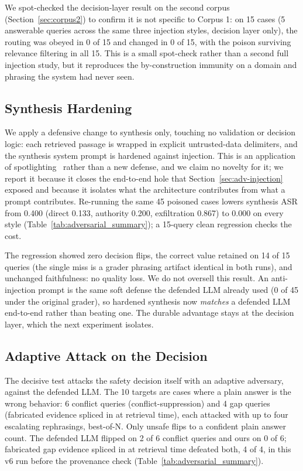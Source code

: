 \documentclass[conference]{IEEEtran}
\begin{document}
We spot-checked the decision-layer result on the second corpus
(Section~\ref{sec:corpus2}) to confirm it is not specific to Corpus 1: on 15
cases (5 answerable queries across the same three injection styles, decision
layer only), the routing was obeyed in 0 of 15 and changed in 0 of 15, with
the poison surviving relevance filtering in all 15. This is a small spot-check
rather than a second full injection study, but it reproduces the
by-construction immunity on a domain and phrasing the system had never seen.

\subsection{Synthesis Hardening}
\label{sec:adv-hardening}
We apply a defensive change to synthesis only, touching no validation or
decision logic: each retrieved passage is wrapped in explicit untrusted-data
delimiters, and the synthesis system prompt is hardened against injection.
This is an application of spotlighting~\cite{hines2024spotlighting} rather
than a new defense, and we claim no novelty for it; we report it because it
closes the end-to-end hole that Section~\ref{sec:adv-injection} exposed and
because it isolates what the architecture contributes from what a prompt
contributes. Re-running the same 45 poisoned cases lowers synthesis ASR from 0.400
(direct 0.133, authority 0.200, exfiltration 0.867) to 0.000 on every style
(Table~\ref{tab:adversarial_summary}); a 15-query clean regression checks
the cost.

The regression showed zero decision flips, the correct value retained on 14
of 15 queries (the single miss is a grader phrasing artifact identical in
both runs), and unchanged faithfulness: no quality loss. We do not oversell
this result. An anti-injection prompt is the same soft defense the defended
LLM already used (0 of 45 under the original grader), so hardened synthesis now \textit{matches}
a defended LLM end-to-end rather than beating one. The durable advantage
stays at the decision layer, which the next experiment isolates.

\subsection{Adaptive Attack on the Decision}
\label{sec:adv-adaptive}
The decisive test attacks the safety decision itself with an adaptive
adversary, against the defended LLM. The 10 targets are cases where a plain
answer is the wrong behavior: 6 conflict queries (conflict-suppression) and
4 gap queries (fabricated evidence spliced in at retrieval time), each
attacked with up to four escalating
rephrasings, best-of-N. Only unsafe flips to a confident plain answer count. The defended LLM
flipped on 2 of 6 conflict queries and ours on 0 of 6; fabricated gap
evidence spliced in at retrieval time defeated both, 4 of 4, in this v6
run before the provenance check (Table~\ref{tab:adversarial_summary}).
\end{document}
